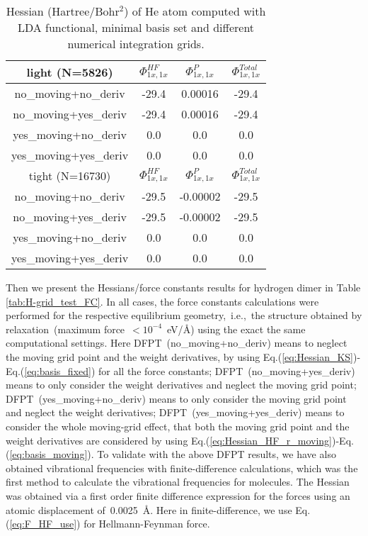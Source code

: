 \documentclass[journal=jpca,manuscript=article]{achemso}
\begin{document}
\begin{table}
\begin{tabular}{c|ccc}
\hline \hline
light (N=5826) & $\Phi^{HF}_{1x,1x}$ & $\Phi^{P}_{1x,1x}$     & $\Phi^{Total}_{1x,1x}$     \\
\hline 
no\_moving+no\_deriv & -29.4 &  0.00016  &-29.4  \\
no\_moving+yes\_deriv & -29.4 &  0.00016  & -29.4 \\
yes\_moving+no\_deriv & 0.0  &  0.0  & 0.0  \\
yes\_moving+yes\_deriv & 0.0  &  0.0  & 0.0  \\
\hline
tight (N=16730)& $\Phi^{HF}_{1x,1x}$ & $\Phi^{P}_{1x,1x}$     & $\Phi^{Total}_{1x,1x}$     \\
\hline
no\_moving+no\_deriv & -29.5  &  -0.00002  &  -29.5 \\
no\_moving+yes\_deriv & -29.5  &  -0.00002  &  -29.5 \\
yes\_moving+no\_deriv & 0.0  &  0.0  & 0.0  \\
yes\_moving+yes\_deriv & 0.0   & 0.0 &  0.0  \\
\hline \hline
\end{tabular}
\caption{Hessian (Hartree/Bohr$^2$) of He atom computed with LDA functional, minimal basis set and different  numerical integration grids. }
\label{tab:He-atom}
\end{table} 

Then we present the Hessians/force constants results
for hydrogen dimer in Table \ref{tab:H-grid_test_FC}. In all cases, the force constants calculations were performed for the respective equilibrium geometry,~i.e.,~the structure obtained by relaxation~(maximum force~$<10^{-4}$~eV/$\mbox{\AA}$) using the exact the same computational settings. Here DFPT~(no\_moving+no\_deriv) means to neglect the moving grid point and the weight derivatives, by using Eq.(\ref{eq:Hessian_KS})-Eq.(\ref{eq:basis_fixed}) for all the force constants; DFPT~(no\_moving+yes\_deriv) means to only consider the weight derivatives and neglect the moving grid point; DFPT~(yes\_moving+no\_deriv) means to only consider the moving grid point and neglect the weight derivatives; DFPT~(yes\_moving+yes\_deriv) means to consider the  whole moving-grid effect, that both the moving grid point and the weight derivatives are considered by using Eq.(\ref{eq:Hessian_HF_r_moving})-Eq.(\ref{eq:basis_moving}). 
To validate with the above DFPT results, we have also obtained vibrational frequencies with finite-difference calculations, which was the first method to calculate the vibrational frequencies for molecules\cite{Handy1993,Malagoli2003}. The Hessian was obtained
via a first order finite difference expression for the forces using an atomic displacement of~0.0025~{\AA}. Here in finite-difference, we use Eq.(\ref{eq:F_HF_use}) for Hellmann-Feynman force. 
\end{document}
